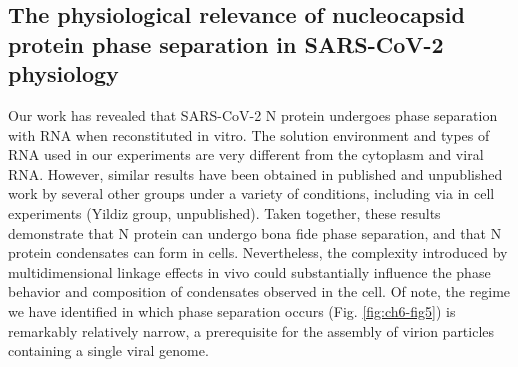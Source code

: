 \documentclass[../main.tex]{subfiles}
\begin{document}
    \subsection{The physiological relevance of nucleocapsid protein phase separation in SARS-CoV-2 physiology}

        Our work has revealed that SARS-CoV-2 N protein undergoes phase separation with RNA when reconstituted in vitro. The solution environment and types of RNA used in our experiments are very different from the cytoplasm and viral RNA. However, similar results have been obtained in published and unpublished work by several other groups under a variety of conditions, including via in cell experiments (Yildiz group, unpublished)\cite{Iserman2020-xm,Perdikari2020-cx,Savastano2020-zf}. Taken together, these results demonstrate that N protein can undergo bona fide phase separation, and that N protein condensates can form in cells. Nevertheless, the complexity introduced by multidimensional linkage effects in vivo could substantially influence the phase behavior and composition of condensates observed in the cell\cite{Riback2020-tw,Choi2019-wg,Wyman1990-qn}. Of note, the regime we have identified in which phase separation occurs (Fig. \ref{fig:ch6-fig5}) is remarkably relatively narrow, a prerequisite for the assembly of virion particles containing a single viral genome.
\end{document}
